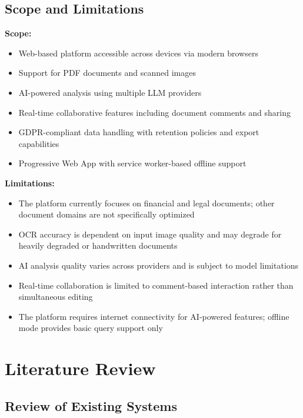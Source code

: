 \documentclass[12pt,a4paper,oneside]{report}
\begin{document}
\section{Scope and Limitations}

\textbf{Scope:}
\begin{itemize}[leftmargin=2cm]
  \item Web-based platform accessible across devices via modern browsers
  \item Support for PDF documents and scanned images
  \item AI-powered analysis using multiple LLM providers
  \item Real-time collaborative features including document comments and sharing
  \item GDPR-compliant data handling with retention policies and export capabilities
  \item Progressive Web App with service worker-based offline support
\end{itemize}

\textbf{Limitations:}
\begin{itemize}[leftmargin=2cm]
  \item The platform currently focuses on financial and legal documents; other document domains are not specifically optimized
  \item OCR accuracy is dependent on input image quality and may degrade for heavily degraded or handwritten documents
  \item AI analysis quality varies across providers and is subject to model limitations
  \item Real-time collaboration is limited to comment-based interaction rather than simultaneous editing
  \item The platform requires internet connectivity for AI-powered features; offline mode provides basic query support only
\end{itemize}

\chapter{Literature Review}

\section{Review of Existing Systems}
\end{document}
